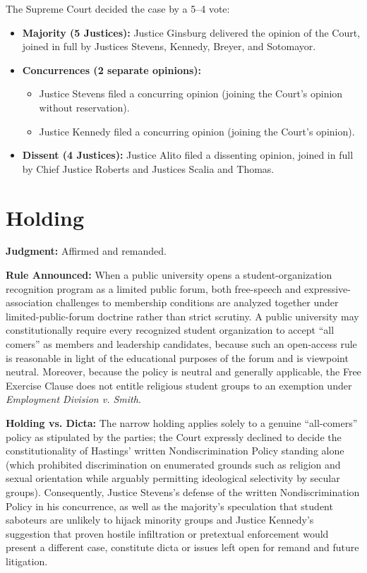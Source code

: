 \documentclass[12pt]{article}
\begin{document}
The Supreme Court decided the case by a 5--4 vote:

\begin{itemize}
  \item \textbf{Majority (5 Justices):} Justice Ginsburg delivered the opinion of the Court, joined in full by Justices Stevens, Kennedy, Breyer, and Sotomayor.
  \item \textbf{Concurrences (2 separate opinions):}
  \begin{itemize}
    \item Justice Stevens filed a concurring opinion (joining the Court's opinion without reservation).
    \item Justice Kennedy filed a concurring opinion (joining the Court's opinion).
  \end{itemize}
  \item \textbf{Dissent (4 Justices):} Justice Alito filed a dissenting opinion, joined in full by Chief Justice Roberts and Justices Scalia and Thomas.
\end{itemize}

\section{Holding}

\textbf{Judgment:} Affirmed and remanded.

\textbf{Rule Announced:} When a public university opens a student-organization recognition program as a limited public forum, both free-speech and expressive-association challenges to membership conditions are analyzed together under limited-public-forum doctrine rather than strict scrutiny. A public university may constitutionally require every recognized student organization to accept ``all comers'' as members and leadership candidates, because such an open-access rule is reasonable in light of the educational purposes of the forum and is viewpoint neutral. Moreover, because the policy is neutral and generally applicable, the Free Exercise Clause does not entitle religious student groups to an exemption under \textit{Employment Division v. Smith}.

\textbf{Holding vs. Dicta:} The narrow holding applies solely to a genuine ``all-comers'' policy as stipulated by the parties; the Court expressly declined to decide the constitutionality of Hastings' written Nondiscrimination Policy standing alone (which prohibited discrimination on enumerated grounds such as religion and sexual orientation while arguably permitting ideological selectivity by secular groups). Consequently, Justice Stevens's defense of the written Nondiscrimination Policy in his concurrence, as well as the majority's speculation that student saboteurs are unlikely to hijack minority groups and Justice Kennedy's suggestion that proven hostile infiltration or pretextual enforcement would present a different case, constitute dicta or issues left open for remand and future litigation.
\end{document}
